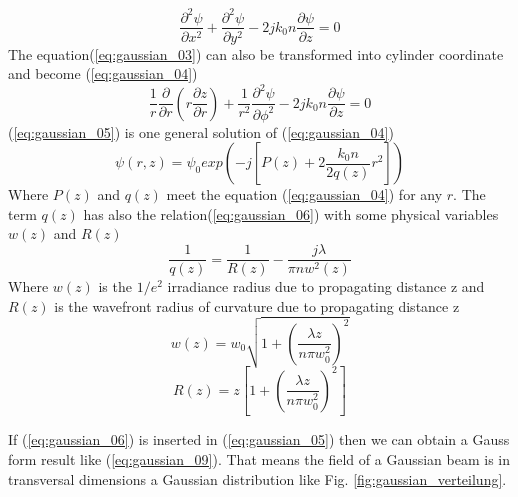 \begin{equation}
\frac{ \partial ^{2}\psi}{\partial x^2}+\frac{\partial ^{2}\psi}{\partial y^2}-2jk_{0}n\frac{\partial\psi}{\partial z}=0
\label{eq:gaussian_03}
\end{equation}
The equation(\ref{eq:gaussian_03}) can also be transformed into cylinder coordinate and become (\ref{eq:gaussian_04})
\begin{equation}
\frac{1}{r}\frac{\partial}{\partial r}\left(r\frac{\partial z}{\partial r}\right)+\frac{1}{r^2}\frac{ \partial ^{2}\psi}{\partial \phi^2}-2jk_{0}n\frac{\partial\psi}{\partial z}=0
\label{eq:gaussian_04}
\end{equation}
(\ref{eq:gaussian_05}) is one general solution of (\ref{eq:gaussian_04})
\begin{equation}
\psi(r,z)=\psi_{0}exp\left(-j\left[P(z)+2 \frac{ k_{0}n}{2q(z)}r^2\right]\right)
\label{eq:gaussian_05}
\end{equation}
Where $P(z)$ and $q(z)$ meet the equation (\ref{eq:gaussian_04}) for any $r$. The term $q(z)$ has also the relation(\ref{eq:gaussian_06}) with some physical variables $w(z)$ and $R(z)$
\begin{equation}
\frac{1}{q(z)}=\frac{1}{R(z)}-\frac{j\lambda}{\pi nw^{2}(z)}
\label{eq:gaussian_06}
\end{equation}
Where $w(z)$ is the $1/e^2$ irradiance radius due to propagating distance z and $R(z)$ is the wavefront radius of curvature due to propagating distance z
\begin{equation}
w(z)=w_{0}\sqrt{1+(\frac{\lambda z}{n\pi w^{2}_{0}})^{2}}
\label{eq:gaussian_07}
\end{equation}
\begin{equation}
R(z)=z\left[1+(\frac{\lambda z}{n\pi w^{2}_{0}})^{2}\right]
\label{eq:gaussian_08}
\end{equation}

If (\ref{eq:gaussian_06}) is inserted in (\ref{eq:gaussian_05}) then we can obtain a Gauss form result like (\ref{eq:gaussian_09}). That means the field of a Gaussian beam is in transversal dimensions a Gaussian distribution like Fig. \ref{fig:gaussian_verteilung}.\\

